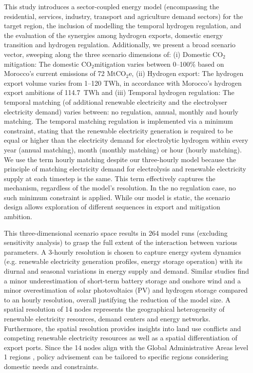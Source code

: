 \documentclass[5p,numafflabel]{elsarticle}
\newcommand{\co}{\ce{CO2}~}
\def\co{CO${}_2${\:}}
\def\coe{CO${}_2$e}
\begin{document}
This study introduces a sector-coupled energy model (encompassing the residential, services, industry, transport and agriculture demand sectors) for the target region, the inclusion of modelling the temporal hydrogen regulation, and the evaluation of the synergies among hydrogen exports, domestic energy transition and hydrogen regulation.
Additionally, we present a broad scenario vector, sweeping along the three scenario dimensions of:
(i) Domestic \co mitigation: The domestic \co mitigation varies between 0--100\% based on Morocco's current emissions of 72 Mt\coe,
(ii) Hydrogen export: The hydrogen export volume varies from 1--120 TWh, in accordance with Morocco's hydrogen export ambitions of 114.7~TWh and
(iii) Temporal hydrogen regulation: The temporal matching (of additional renewable electricity and the electrolyser electricity demand) varies between: no regulation, annual, monthly and hourly matching. The temporal matching regulation is implemented via a minimum constraint, stating that the renewable electricity generation is required to be equal or higher than the electricity demand for electrolytic hydrogen within every year (annual matching), month (monthly matching) or hour (hourly matching). 
We use the term hourly matching despite our three-hourly model because the principle of matching electricity demand for electrolysis and renewable electricity supply at each timestep is the same. This term effectively captures the mechanism, regardless of the model’s resolution. In the no regulation case, no such minimum constraint is applied.
While our model is static, the scenario design allows exploration of different sequences in export and mitigation ambition.

This three-dimensional scenario space results in 264 model runs (excluding sensitivity analysis) to grasp the full extent of the interaction between various parameters.
A 3-hourly resolution is chosen to capture energy system dynamics (e.g. renewable electricity generation profiles, energy storage operation) with its diurnal and seasonal variations in energy supply and demand. Similar studies \cite{Neumann2023, Schlachtberger2018} find a minor underestimation of short-term battery storage and onshore wind and a minor overestimation of solar photovoltaics (PV) and hydrogen storage compared to an hourly resolution, overall justifying the reduction of the model size. 
A spatial resolution of 14 nodes represents the geographical heterogeneity of renewable electricity resources, demand centers and energy networks. Furthermore, the spatial resolution provides insights into land use conflicts and competing renewable electricity resources as well as a spatial differentiation of export ports. Since the 14 nodes align with the Global Administrative Areas level 1 regions \cite{gadm2022}, policy advisement can be tailored to specific regions considering domestic needs and constraints.
\end{document}
